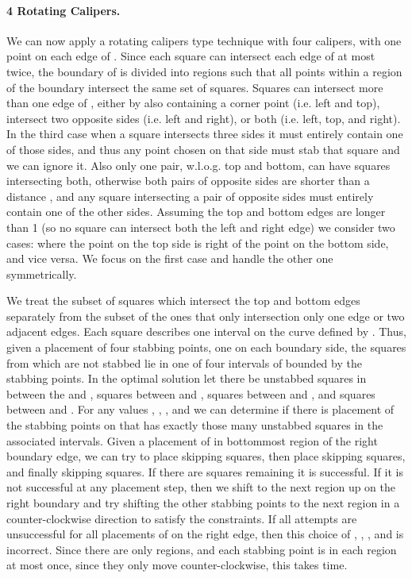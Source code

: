 \documentclass[11pt]{myclass}
\begin{document}
\paragraph{4 Rotating Calipers.}
We can now apply a rotating calipers type technique with four calipers, with one point on each edge of .  Since each square can intersect each edge of  at most twice, the boundary of  is divided into  regions such that all points within a region of the boundary intersect the same set of squares.  Squares can intersect more than one edge of , either by also containing a corner point (i.e. left and top), intersect two opposite sides (i.e. left and right), or both (i.e. left, top, and right).  In the third case when a square intersects three sides it must entirely contain one of those sides, and thus any point chosen on that side must stab that square and we can ignore it.  Also only one pair, w.l.o.g. top and bottom, can have squares intersecting both, otherwise both pairs of opposite sides are shorter than a distance , and any square intersecting a pair of opposite sides must entirely contain one of the other sides.  Assuming the top and bottom edges are longer than 1 (so no square can intersect both the left and right edge) we consider two cases: where the point on the top side is right of the point on the bottom side, and vice versa.  We focus on the first case and handle the other one symmetrically.  

We treat the subset of squares  which intersect the top and bottom edges separately from the subset  of the ones that only intersection only one edge or two adjacent edges.  
Each square  describes one interval on the curve defined by .  Thus, given a placement of four stabbing points, one on each boundary side, the squares from  which are not stabbed lie in one of four intervals of  bounded by the stabbing points.  In the optimal solution let there be  unstabbed squares in  between the  and ,  squares between  and ,  squares between  and , and  squares between  and .  For any values , , , and  we can determine if there is placement of the stabbing points on  that has exactly those many unstabbed squares in the associated intervals.  
Given a placement of  in bottommost region of the right boundary edge, we can try to place  skipping  squares, then place  skipping  squares, and finally  skipping  squares.  If there are  squares remaining it is successful.  If it is not successful at any placement step, then we shift  to the next region up on the right boundary and try shifting the other stabbing points to the next region in a counter-clockwise direction to satisfy the constraints.  If all attempts are unsuccessful for all placements of  on the right edge, then this choice of , , , and  is incorrect.  Since there are only  regions, and each stabbing point is in each region at most once, since they only move counter-clockwise, this takes  time.  
\end{document}
